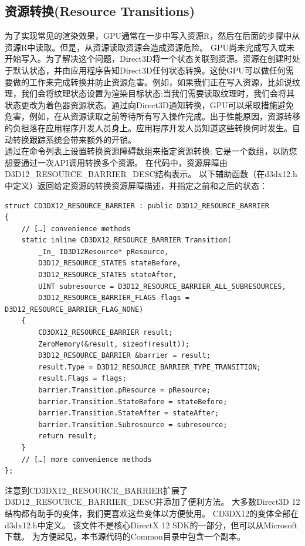 \documentclass[11pt,a4paper,oldfontcommands]{memoir}
\begin{document}
{\subsection{资源转换(Resource Transitions)}
\begin{flushleft}
为了实现常见的渲染效果，GPU通常在一步中写入资源R，然后在后面的步骤中从资源R中读取。但是，从资源读取资源会造成资源危险。 GPU尚未完成写入或未开始写入。为了解决这个问题，Direct3D将一个状态关联到资源。资源在创建时处于默认状态，并由应用程序告知Direct3D任何状态转换。这使GPU可以做任何需要做的工作来完成转换并防止资源危害。例如，如果我们正在写入资源，比如说纹理，我们会将纹理状态设置为渲染目标状态;当我们需要读取纹理时，我们会将其状态更改为着色器资源状态。通过向Direct3D通知转换，GPU可以采取措施避免危害，例如，在从资源读取之前等待所有写入操作完成。出于性能原因，资源转移的负担落在应用程序开发人员身上。应用程序开发人员知道这些转换何时发生。自动转换跟踪系统会带来额外的开销。\\
通过在命令列表上设置转换资源障碍数组来指定资源转换; 它是一个数组，以防您想要通过一次API调用转换多个资源。 在代码中，资源屏障由D3D12\_RESOURCE\_BARRIER_DESC结构表示。 以下辅助函数（在d3dx12.h中定义）返回给定资源的转换资源屏障描述，并指定之前和之后的状态：\\
\begin{lstlisting}
struct CD3DX12_RESOURCE_BARRIER : public D3D12_RESOURCE_BARRIER
{
    // […] convenience methods
    static inline CD3DX12_RESOURCE_BARRIER Transition(
        _In_ ID3D12Resource* pResource,
        D3D12_RESOURCE_STATES stateBefore,
        D3D12_RESOURCE_STATES stateAfter,
        UINT subresource = D3D12_RESOURCE_BARRIER_ALL_SUBRESOURCES,
        D3D12_RESOURCE_BARRIER_FLAGS flags = D3D12_RESOURCE_BARRIER_FLAG_NONE)
    {
        CD3DX12_RESOURCE_BARRIER result;
        ZeroMemory(&result, sizeof(result));
        D3D12_RESOURCE_BARRIER &barrier = result;
        result.Type = D3D12_RESOURCE_BARRIER_TYPE_TRANSITION;
        result.Flags = flags;
        barrier.Transition.pResource = pResource;
        barrier.Transition.StateBefore = stateBefore;
        barrier.Transition.StateAfter = stateAfter;
        barrier.Transition.Subresource = subresource;
        return result;
    }
    // […] more convenience methods
};
\end{lstlisting}
注意到CD3DX12\_RESOURCE\_BARRIER扩展了D3D12\_RESOURCE\_BARRIER\_DESC并添加了便利方法。 大多数Direct3D 12结构都有助手的变体，我们更喜欢这些变体以方便使用。 CD3DX12的变体全部在d3dx12.h中定义。 该文件不是核心DirectX 12 SDK的一部分，但可以从Microsoft下载。 为方便起见，本书源代码的Common目录中包含一个副本。\\

\end{flushleft}}
\end{document}
